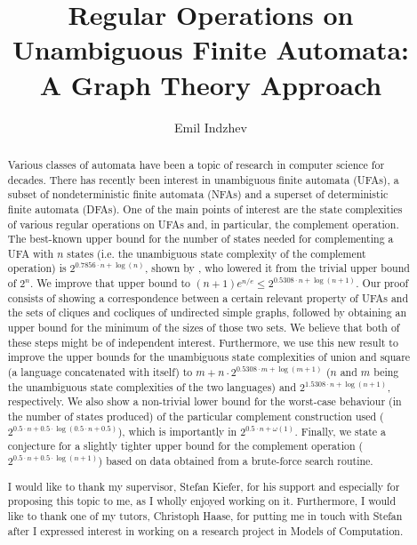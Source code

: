 \documentclass{report}
\title{Regular Operations on Unambiguous Finite Automata: \\
A Graph Theory Approach}
\author{Emil Indzhev}
\theoremstyle{definition}
\newenvironment{acknowledgements}
{\renewcommand\abstractname{Acknowledgements}\begin{abstract}} {\end{abstract}}
\begin{document}
\maketitle

\begin{abstract}

Various classes of automata have been a topic of research in computer science
for decades. There has recently been interest in unambiguous finite automata
(UFAs), a subset of nondeterministic finite automata (NFAs) and a superset of
deterministic finite automata (DFAs). One of the main points of interest
are the state complexities of various regular operations on UFAs and, in
particular, the complement operation. The best-known upper bound for the
number of states needed for complementing a UFA with $n$ states (i.e. the
unambiguous state complexity of the complement operation) is
$2^{0.7856 \cdot n + \log (n)}$, shown by
\cite{UFA_UB}, who lowered it from the trivial upper bound of $2^n$. We improve
that upper bound to $(n + 1) e^{n / e} \leq 2^{0.5308 \cdot n + \log (n + 1)}$.
Our proof consists of showing a correspondence between a certain relevant
property of UFAs and the sets of cliques and cocliques of undirected simple
graphs, followed by obtaining an upper bound for the minimum of the sizes
of those two sets. We believe that both of these steps might be of independent
interest. Furthermore, we use this new result to improve the upper bounds for
the unambiguous state complexities of union and square (a language concatenated
with itself) to $m + n \cdot 2^{0.5308 \cdot m + \log (m + 1)}$ ($n$ and $m$ being the
unambiguous state complexities of the two languages) and 
$2^{1.5308 \cdot n + \log (n + 1)}$, respectively. We also show a non-trivial
lower bound for the worst-case behaviour (in the number of states produced) of
the particular complement construction used
($2^{0.5 \cdot n + 0.5 \cdot \log (0.5 \cdot n + 0.5)}$),
which is importantly in $2^{0.5 \cdot n + \omega (1)}$.
Finally, we state a conjecture for a slightly tighter upper bound for the
complement operation ($2^{0.5 \cdot n + 0.5 \cdot \log (n + 1)}$) based on
data obtained from a brute-force search routine.

\end{abstract}

\begin{acknowledgements}

I would like to thank my supervisor, Stefan Kiefer, for his support and
especially for proposing this topic to me, as I wholly enjoyed working on it.
Furthermore, I would like to thank one of my tutors, Christoph Haase, for putting
me in touch with Stefan after I expressed interest in working on a research
project in Models of Computation.

\end{acknowledgements}
\end{document}
